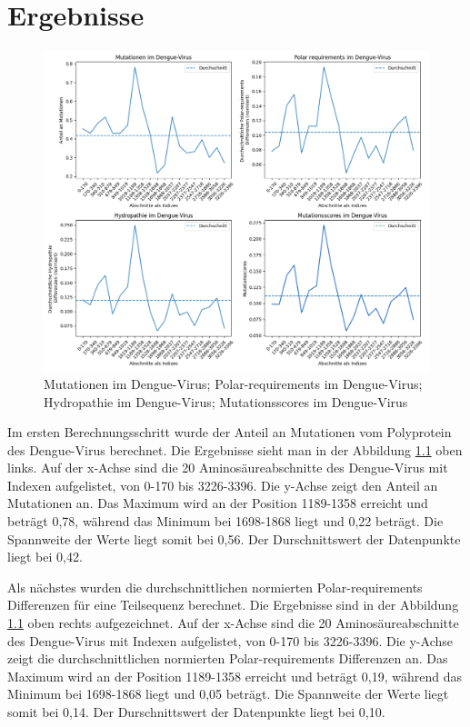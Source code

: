 \documentclass[german,version-2022-01]{uzl-thesis}
\begin{document}
\chapter{Ergebnisse}
\begin{figure}[tbp]
  \centering
  \includegraphics[scale=0.36]{Images/Diagramm_combined_pictures_Dengue_virus.png}
  \caption{Mutationen im Dengue-Virus; Polar-requirements im Dengue-Virus; Hydropathie im Dengue-Virus; Mutationsscores im Dengue-Virus}
  \label{fig:Dengue_virus_combined}
\end{figure}


Im ersten Berechnungsschritt wurde der Anteil an Mutationen vom Polyprotein des Dengue-Virus berechnet. Die Ergebnisse sieht man in der Abbildung \ref{fig:Dengue_virus_combined} oben links. Auf der x-Achse sind die 20 Aminos\"aureabschnitte des Dengue-Virus mit Indexen aufgelistet, von 0-170 bis 3226-3396. Die y-Achse zeigt den Anteil an Mutationen an. Das Maximum wird an der Position 1189-1358 erreicht und betr\"agt 0,78, w\"ahrend das Minimum bei 1698-1868 liegt und 0,22 betr\"agt. Die Spannweite der Werte liegt somit bei 0,56. Der Durschnittswert der Datenpunkte liegt bei 0,42. 

Als n\"achstes wurden die durchschnittlichen normierten Polar-requirements Differenzen f\"ur eine Teilsequenz berechnet. Die Ergebnisse sind in der Abbildung \ref{fig:Dengue_virus_combined} oben rechts aufgezeichnet. Auf der x-Achse sind die 20 Aminos\"aureabschnitte des Dengue-Virus mit Indexen aufgelistet, von 0-170 bis 3226-3396. Die y-Achse zeigt die durchschnittlichen normierten Polar-requirements Differenzen an. Das Maximum wird an der Position 1189-1358 erreicht und betr\"agt 0,19, w\"ahrend das Minimum bei 1698-1868 liegt und 0,05 betr\"agt. Die Spannweite der Werte liegt somit bei 0,14. Der Durschnittswert der Datenpunkte liegt bei 0,10. 
\end{document}
